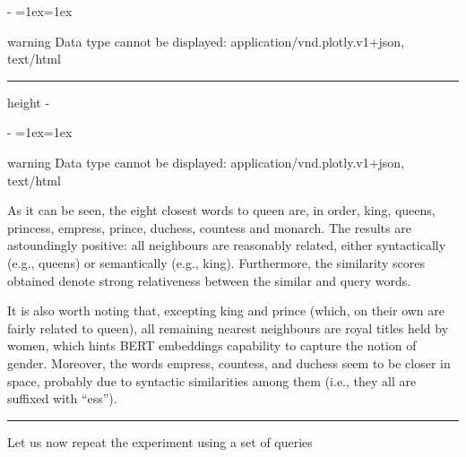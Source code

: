 \documentclass[letterpaper,10pt,english]{sphinxmanual}
\makeatletter
\newenvironment{nbsphinxfancyoutput}{%
    \let\sphinxincludegraphics\nbsphinxincludegraphics
    \nbsphinx@image@maxheight\textheight
    \advance\nbsphinx@image@maxheight -2\fboxsep   %
    \advance\nbsphinx@image@maxheight -2\fboxrule  %
    \advance\nbsphinx@image@maxheight -\baselineskip
\def\nbsphinxfcolorbox{\spx@fcolorbox{nbsphinx-code-border}{white}}%
\def\FrameCommand{\nbsphinxfcolorbox\nbsphinxfancyaddprompt\@empty}%
\def\FirstFrameCommand{\nbsphinxfcolorbox\nbsphinxfancyaddprompt\sphinxVerbatim@Continues}%
\def\MidFrameCommand{\nbsphinxfcolorbox\sphinxVerbatim@Continued\sphinxVerbatim@Continues}%
\def\LastFrameCommand{\nbsphinxfcolorbox\sphinxVerbatim@Continued\@empty}%
\MakeFramed{\advance\hsize-\width\@totalleftmargin\z@\linewidth\hsize\@setminipage}%
\lineskip=1ex\lineskiplimit=1ex\raggedright%
}{\par\unskip\@minipagefalse\endMakeFramed}
\def\nbsphinxfancyaddprompt{\ifvoid\nbsphinxpromptbox\else
    \kern\fboxrule\kern\fboxsep
    \copy\nbsphinxpromptbox
    \kern-\ht\nbsphinxpromptbox\kern-\dp\nbsphinxpromptbox
    \kern-\fboxsep\kern-\fboxrule\nointerlineskip
    \fi}
\newlength\nbsphinxcodecellspacing
\newcommand*{\nbsphinxincludegraphics}[2][]{%
    \gdef\spx@includegraphics@options{#1}%
    \setbox\spx@image@box\hbox{\texttt{[image: \#2]}}%
    \in@false
    \ifdim \wd\spx@image@box>\linewidth
      \g@addto@macro\spx@includegraphics@options{,width=\linewidth}%
      \in@true
    \fi
    \ifdim \ht\spx@image@box>\nbsphinx@image@maxheight
      \g@addto@macro\spx@includegraphics@options{,height=\nbsphinx@image@maxheight}%
      \in@true
    \fi
    \ifin@
      \g@addto@macro\spx@includegraphics@options{,keepaspectratio}%
    \fi
    \setbox\spx@image@box\box\voidb@x %
    \expandafter\includegraphics\expandafter[\spx@includegraphics@options]{#2}%
}%
\makeatother
\begin{document}
\makeatletter\setbox\nbsphinxpromptbox\box\voidb@x\makeatother

\begin{nbsphinxfancyoutput}

\begin{sphinxadmonition}{warning}{}\unskip
Data type cannot be displayed: application/vnd.plotly.v1+json, text/html
\end{sphinxadmonition}

\end{nbsphinxfancyoutput}

\hrule height -\fboxrule\relax
\vspace{\nbsphinxcodecellspacing}

\makeatletter\setbox\nbsphinxpromptbox\box\voidb@x\makeatother

\begin{nbsphinxfancyoutput}

\begin{sphinxadmonition}{warning}{}\unskip
Data type cannot be displayed: application/vnd.plotly.v1+json, text/html
\end{sphinxadmonition}

\end{nbsphinxfancyoutput}

As it can be seen, the eight closest words to queen are, in order, king, queens, princess, empress, prince, duchess, countess and monarch. The results are astoundingly positive: all neighbours are reasonably related, either syntactically (e.g., queens) or semantically (e.g., king). Furthermore, the similarity scores obtained denote strong relativeness between the similar and query words.

It is also worth noting that, excepting king and prince (which, on their own are fairly related to queen), all remaining nearest neighbours are royal titles held by women, which hints BERT embeddings capability to capture the notion of gender. Moreover, the words empress, countess, and duchess seem to be closer in space, probably due to syntactic similarities among them (i.e., they all are suffixed with “ess”).


\bigskip\hrule\bigskip


Let us now repeat the experiment using a set of queries
\end{document}
